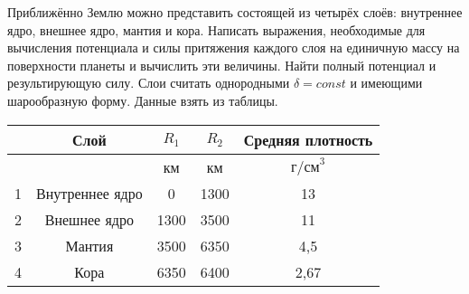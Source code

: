 \documentclass[11pt, a4paper,addpoints]{exam}
\theoremstyle{remark}
\begin{document}
\begin{questions}
\begin{parts}
        \part По полученным значениям потенциала и силы построить графики для $r\in (0, r_5]$.
    \end{parts}
    \question Приближённо Землю можно представить состоящей из четырёх
    слоёв: внутреннее ядро, внешнее ядро, мантия и кора. Написать выражения, необходимые для 
    вычисления потенциала и силы притяжения каждого слоя на единичную массу на поверхности планеты и 
    вычислить эти величины. Найти полный потенциал и результирующую силу. Слои считать однородными 
    $\delta = const$ и имеющими шарообразную форму. Данные взять из таблицы. 
    \begin{table}[h]
            \centering
            \begin{tabular}{|c|c|c|c|c|}
                \hline
                & Слой & $R_1$ & $R_2$ & Средняя плотность \\\hline
                &  & км & км & $\text{г/см}^3$ \\\hline
                1 & Внутреннее ядро  & 0  & 1300  & 13 \\\hline
                2 & Внешнее ядро  & 1300  & 3500  & 11 \\\hline
                3 & Мантия  & 3500  & 6350  & 4,5 \\\hline
                4 & Кора & 6350  & 6400  & 2,67 \\\hline
            \end{tabular}
        \end{table}
\end{questions}
\end{document}
